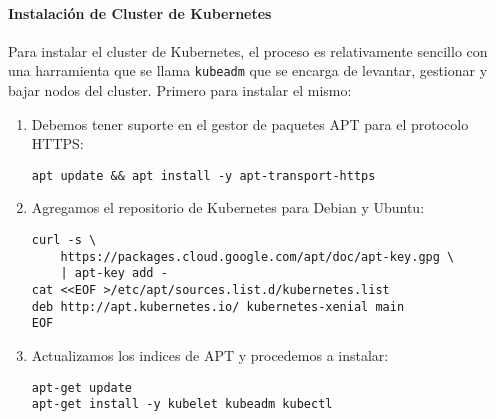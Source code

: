 \paragraph{Instalación de Cluster de Kubernetes}
Para instalar el cluster de Kubernetes, el proceso es relativamente sencillo con una harramienta que se llama \texttt{kubeadm} que se encarga de levantar, gestionar y bajar nodos del cluster. Primero para instalar el mismo:
\begin{enumerate}
	\item Debemos tener suporte en el gestor de paquetes APT para el protocolo HTTPS:
    \begin{lstlisting}
apt update && apt install -y apt-transport-https
    \end{lstlisting}	
	\item Agregamos el repositorio de Kubernetes para Debian y Ubuntu:
    \begin{lstlisting}
curl -s \
	https://packages.cloud.google.com/apt/doc/apt-key.gpg \
	| apt-key add -
cat <<EOF >/etc/apt/sources.list.d/kubernetes.list
deb http://apt.kubernetes.io/ kubernetes-xenial main
EOF
    \end{lstlisting}
    \item Actualizamos los indices de APT y procedemos a instalar:
    \begin{lstlisting}
apt-get update
apt-get install -y kubelet kubeadm kubectl
    \end{lstlisting}
\end{enumerate}

